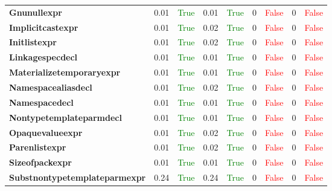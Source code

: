 \documentclass{article}
\begin{document}
\begin{xltabular}{\textwidth}{lcccccccc}
\textbf{{\fontsize{10}{12}\selectfont Gnunullexpr}}& 0.01&\textcolor{green}{True}& 0.01&\textcolor{green}{True}& 0&\textcolor{red}{False}& 0&\textcolor{red}{False} \\[0.5ex]
\textbf{{\fontsize{10}{12}\selectfont Implicitcastexpr}}& 0.01&\textcolor{green}{True}& 0.02&\textcolor{green}{True}& 0&\textcolor{red}{False}& 0&\textcolor{red}{False} \\[0.5ex]
\textbf{{\fontsize{10}{12}\selectfont Initlistexpr}}& 0.01&\textcolor{green}{True}& 0.02&\textcolor{green}{True}& 0&\textcolor{red}{False}& 0&\textcolor{red}{False} \\[0.5ex]
\textbf{{\fontsize{10}{12}\selectfont Linkagespecdecl}}& 0.01&\textcolor{green}{True}& 0.01&\textcolor{green}{True}& 0&\textcolor{red}{False}& 0&\textcolor{red}{False} \\[0.5ex]
\textbf{{\fontsize{10}{12}\selectfont Materializetemporaryexpr}}& 0.01&\textcolor{green}{True}& 0.01&\textcolor{green}{True}& 0&\textcolor{red}{False}& 0&\textcolor{red}{False} \\[0.5ex]
\textbf{{\fontsize{10}{12}\selectfont Namespacealiasdecl}}& 0.01&\textcolor{green}{True}& 0.02&\textcolor{green}{True}& 0&\textcolor{red}{False}& 0&\textcolor{red}{False} \\[0.5ex]
\textbf{{\fontsize{10}{12}\selectfont Namespacedecl}}& 0.01&\textcolor{green}{True}& 0.01&\textcolor{green}{True}& 0&\textcolor{red}{False}& 0&\textcolor{red}{False} \\[0.5ex]
\textbf{{\fontsize{10}{12}\selectfont Nontypetemplateparmdecl}}& 0.01&\textcolor{green}{True}& 0.01&\textcolor{green}{True}& 0&\textcolor{red}{False}& 0&\textcolor{red}{False} \\[0.5ex]
\textbf{{\fontsize{10}{12}\selectfont Opaquevalueexpr}}& 0.01&\textcolor{green}{True}& 0.02&\textcolor{green}{True}& 0&\textcolor{red}{False}& 0&\textcolor{red}{False} \\[0.5ex]
\textbf{{\fontsize{10}{12}\selectfont Parenlistexpr}}& 0.01&\textcolor{green}{True}& 0.02&\textcolor{green}{True}& 0&\textcolor{red}{False}& 0&\textcolor{red}{False} \\[0.5ex]
\textbf{{\fontsize{10}{12}\selectfont Sizeofpackexpr}}& 0.01&\textcolor{green}{True}& 0.01&\textcolor{green}{True}& 0&\textcolor{red}{False}& 0&\textcolor{red}{False} \\[0.5ex]
\textbf{{\fontsize{10}{12}\selectfont Substnontypetemplateparmexpr}}& 0.24&\textcolor{green}{True}& 0.24&\textcolor{green}{True}& 0&\textcolor{red}{False}& 0&\textcolor{red}{False} \\[0.5ex]

\end{xltabular}
\end{document}
